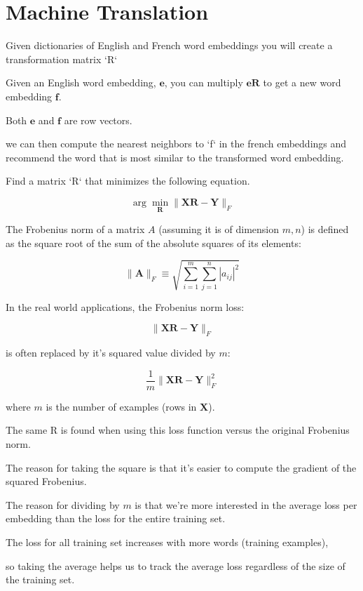 \documentclass[4apaper,12pt]{book}
\begin{document}
\section {Machine Translation}
\begin{description}

\item Given dictionaries of English and French word embeddings you will create a transformation matrix `R`
\item Given an English word embedding, $\mathbf{e}$, you can multiply $\mathbf{eR}$ to get a new word embedding $\mathbf{f}$.
\item Both $\mathbf{e}$ and $\mathbf{f}$ are row vectors.
\item we can then compute the nearest neighbors to `f` in the french embeddings and recommend the word that is most similar to the transformed word embedding.

\item Find a matrix `R` that minimizes the following equation.

\item $$\arg \min _{\mathbf{R}}\| \mathbf{X R} - \mathbf{Y}\|_{F} $$

\item The Frobenius norm of a matrix $A$ (assuming it is of dimension $m,n$) is defined as the square root of the sum of the absolute squares of its elements:

\item $$\|\mathbf{A}\|_{F} \equiv \sqrt{\sum_{i=1}^{m} \sum_{j=1}^{n}\left|a_{i j}\right|^{2}}$$


\item In the real world applications, the Frobenius norm loss:

\item $$\| \mathbf{XR} - \mathbf{Y}\|_{F}$$

\item is often replaced by it's squared value divided by $m$:

\item $$ \frac{1}{m} \|  \mathbf{X R} - \mathbf{Y} \|_{F}^{2}$$

\item where $m$ is the number of examples (rows in $\mathbf{X}$).

\item The same R is found when using this loss function versus the original Frobenius norm.
\item The reason for taking the square is that it's easier to compute the gradient of the squared Frobenius.
\item The reason for dividing by $m$ is that we're more interested in the average loss per embedding than the  loss for the entire training set.
\item The loss for all training set increases with more words (training examples),
\item so taking the average helps us to track the average loss regardless of the size of the training set.
\end{description}
\end{document}

